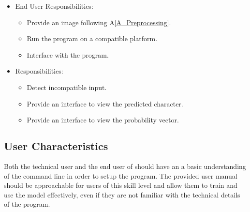 \documentclass[12pt]{article}
\begin{document}
\begin{itemize}
\item End User Responsibilities:
\begin{itemize}
\item Provide an image following A\ref{A_Preprocessing}.
\item Run the program on a compatible platform.
\item Interface with the program.
\end{itemize}
\item \progname{} Responsibilities:
\begin{itemize}
\item Detect incompatible input.
\item Provide an interface to view the predicted character.
\item Provide an interface to view the probability vector.
\end{itemize}
\end{itemize}


\subsection{User Characteristics} \label{SecUserCharacteristics}

Both the technical user and the end user of \progname{} should have an a basic
understanding of the command line in order to setup the program. The provided
user manual should be approachable for users of this skill level and allow them
to train and use the model effectively, even if they are not familiar with the
technical details of the program.

\end{document}
